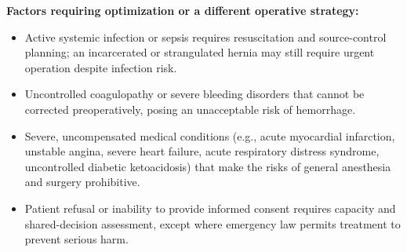 \textbf{Factors requiring optimization or a different operative strategy:}
\begin{itemize}
  \item Active systemic infection or sepsis requires resuscitation and source-control planning; an incarcerated or strangulated hernia may still require urgent operation despite infection risk.
  
  \item Uncontrolled coagulopathy or severe bleeding disorders that cannot be corrected preoperatively, posing an unacceptable risk of hemorrhage.
  
  \item Severe, uncompensated medical conditions (e.g., acute myocardial infarction, unstable angina, severe heart failure, acute respiratory distress syndrome, uncontrolled diabetic ketoacidosis) that make the risks of general anesthesia and surgery prohibitive.
  
  \item Patient refusal or inability to provide informed consent requires capacity and shared-decision assessment, except where emergency law permits treatment to prevent serious harm.
\end{itemize}

